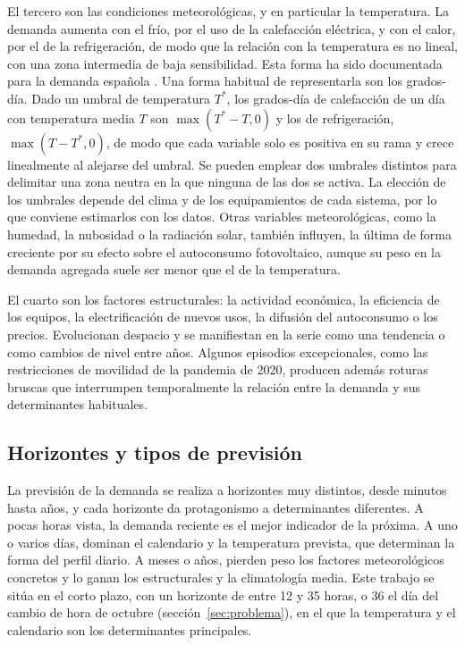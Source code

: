 El tercero son las condiciones meteorológicas, y en particular la
temperatura. La demanda aumenta con el frío, por el uso de la calefacción
eléctrica, y con el calor, por el de la refrigeración, de modo que la
relación con la temperatura es no lineal, con una zona intermedia de baja
sensibilidad. Esta forma ha sido documentada para la demanda española
\parencite{valor2001daily,moralcarcedo2005modelling}. Una forma habitual de
representarla son los grados-día. Dado un umbral de temperatura $T^{*}$, los
grados-día de calefacción de un día con temperatura media $T$ son
$\max(T^{*} - T, 0)$ y los de refrigeración, $\max(T - T^{*}, 0)$, de modo
que cada variable solo es positiva en su rama y crece linealmente al
alejarse del umbral. Se pueden emplear dos umbrales distintos para delimitar
una zona neutra en la que ninguna de las dos se activa. La elección de los
umbrales depende del clima y de los equipamientos de cada sistema, por lo que
conviene estimarlos con los datos. Otras variables meteorológicas, como la
humedad, la nubosidad o la radiación solar, también influyen, la última de
forma creciente por su efecto sobre el autoconsumo fotovoltaico, aunque su
peso en la demanda agregada suele ser menor que el de la temperatura.

El cuarto son los factores estructurales: la actividad económica, la
eficiencia de los equipos, la electrificación de nuevos usos, la difusión
del autoconsumo o los precios. Evolucionan despacio y se manifiestan en la
serie como una tendencia o como cambios de nivel entre años. Algunos
episodios excepcionales, como las restricciones de movilidad de la pandemia
de 2020, producen además roturas bruscas que interrumpen temporalmente la
relación entre la demanda y sus determinantes habituales.

\subsection{Horizontes y tipos de previsión}\label{sec:tipos-prevision}

La previsión de la demanda se realiza a horizontes muy distintos, desde
minutos hasta años, y cada horizonte da protagonismo a determinantes
diferentes. A pocas horas vista, la demanda reciente es el mejor indicador
de la próxima. A uno o varios días, dominan el calendario y la temperatura
prevista, que determinan la forma del perfil diario. A meses o años, pierden
peso los factores meteorológicos concretos y lo ganan los estructurales y la
climatología media. Este trabajo se sitúa en el corto plazo, con un horizonte
de entre 12 y 35 horas, o 36 el día del cambio de hora de octubre
(sección~\ref{sec:problema}), en el que la
temperatura y el calendario son los determinantes principales.

